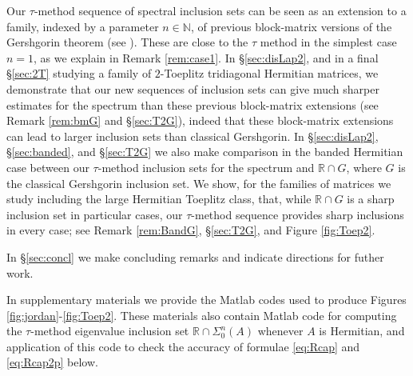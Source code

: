 \documentclass[preprint,1p,11pt]{elsarticle}
\newcommand\N{{\mathbb N}}
\newcommand\R{{\mathbb R}}
\newcommand\eps{{\varepsilon}}
\numberwithin{equation}{section}   %
\numberwithin{figure}{section}  %
\begin{document}
Our $\tau$-method sequence of spectral inclusion sets can be seen as an extension to a family, indexed by a parameter $n\in \N$, of previous block-matrix versions of the Gershgorin theorem  (see \cite{Ostrowski,Feingold,Fiedler,Varga}). These are close to the $\tau$ method in the simplest case $n=1$, as we explain in Remark \ref{rem:case1}. In \S\ref{sec:disLap2}, and in a final \S\ref{sec:2T} studying a family of $2$-Toeplitz tridiagonal Hermitian matrices, we demonstrate that our new sequences of inclusion sets can give much sharper estimates for the spectrum than these previous block-matrix extensions (see Remark \ref{rem:bmG} and \S\ref{sec:T2G}), indeed that these block-matrix extensions can lead to larger inclusion sets than classical Gershgorin.
 In \S\ref{sec:disLap2}, \S\ref{sec:banded}, and \S\ref{sec:T2G} we also make comparison in the banded Hermitian case between our  $\tau$-method inclusion sets for the spectrum and $\R\cap G$, where $G$ is the classical Gershgorin inclusion set. We show, for the families of matrices we study including the large Hermitian Toeplitz class, that, while $\R\cap G$ is a sharp inclusion set in particular cases, our $\tau$-method sequence provides sharp inclusions in every case; see Remark \ref{rem:BandG}, \S\ref{sec:T2G}, and Figure \ref{fig:Toep2}.

In \S\ref{sec:concl} we make concluding remarks and indicate directions for futher work. 

In supplementary materials we provide the Matlab codes used to produce Figures \ref{fig:jordan}-\ref{fig:Toep2}. These materials also contain Matlab code for computing the $\tau$-method eigenvalue inclusion set $\R\cap \Sigma_0^n(A)$ whenever $A$ is Hermitian, and application of this code to check the accuracy of formulae \eqref{eq:Rcap} and \eqref{eq:Rcap2p} below.
\end{document}
